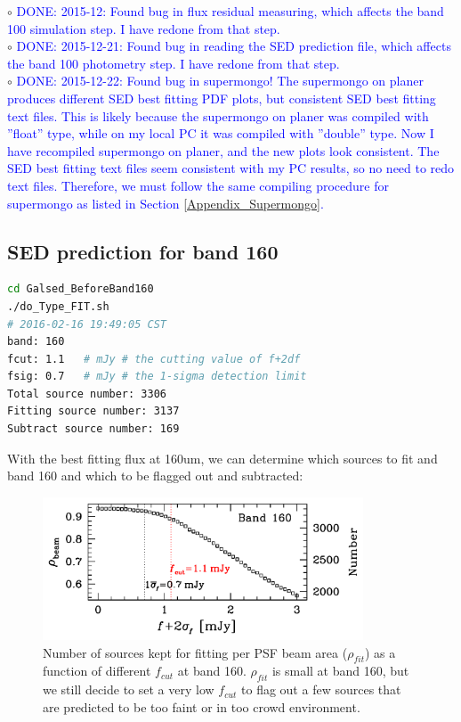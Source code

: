 \documentclass[11pt,a4paper]{article}
\begin{document}
\indent\hspace{15pt}$\circ$ 
\textcolor{blue}{DONE: 2015-12: Found bug in flux residual measuring, which affects the band 100 simulation step. I have redone from that step.}
\\
\indent\hspace{15pt}$\circ$ 
\textcolor{blue}{DONE: 2015-12-21: Found bug in reading the SED prediction file, which affects the band 100 photometry step. I have redone from that step.}
\\
\indent\hspace{15pt}$\circ$ 
\textcolor{blue}{DONE: 2015-12-22: Found bug in supermongo! The supermongo on planer produces different SED best fitting PDF plots, but consistent SED best fitting text files. This is likely because the supermongo on planer was compiled with ''float'' type, while on my local PC it was compiled with ''double'' type. Now I have recompiled supermongo on planer, and the new plots look consistent. The SED best fitting text files seem consistent with my PC results, so no need to redo text files. Therefore, we must follow the same compiling procedure for supermongo as listed in Section \ref{Appendix_Supermongo}.}
\\

\subsection{SED prediction for band 160}
\label{Band160_Galpre}

\begin{lstlisting}[language=bash]
cd Galsed_BeforeBand160
./do_Type_FIT.sh
# 2016-02-16 19:49:05 CST
band: 160
fcut: 1.1   # mJy # the cutting value of f+2df
fsig: 0.7   # mJy # the 1-sigma detection limit
Total source number: 3306
Fitting source number: 3137
Subtract source number: 169
\end{lstlisting}

With the best fitting flux at 160um, we can determine which sources to fit and band 160 and which to be flagged out and subtracted: 

\begin{figure}[H]
	\caption{Number of sources kept for fitting per PSF beam area ($\rho_{fit}$) as a function of different $f_{cut}$ at band 160. $\rho_{fit}$ is small at band 160, but we still decide to set a very low $f_{cut}$ to flag out a few sources that are predicted to be too faint or in too crowd environment.}
	\includegraphics[width=0.85\textwidth]{plot_cutting_flux_160}
\end{figure}
\end{document}
